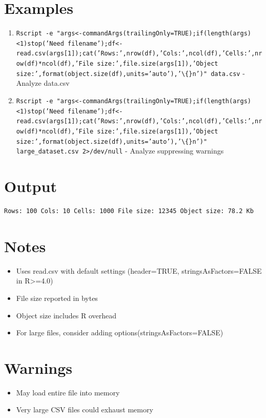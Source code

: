 \documentclass{article}
\begin{document}
\section*{Examples}
\begin{enumerate}
  \item \texttt{Rscript -e "args<-commandArgs(trailingOnly=TRUE);if(length(args)<1)stop('Need filename');df<-read.csv(args[1]);cat('Rows:',nrow(df),'Cols:',ncol(df),'Cells:',nrow(df)*ncol(df),'File size:',file.size(args[1]),'Object size:',format(object.size(df),units='auto'),'\textbackslash\{\}n')" data.csv} - Analyze data.csv
  \item \texttt{Rscript -e "args<-commandArgs(trailingOnly=TRUE);if(length(args)<1)stop('Need filename');df<-read.csv(args[1]);cat('Rows:',nrow(df),'Cols:',ncol(df),'Cells:',nrow(df)*ncol(df),'File size:',file.size(args[1]),'Object size:',format(object.size(df),units='auto'),'\textbackslash\{\}n')" large\_dataset.csv 2>/dev/null} - Analyze suppressing warnings
\end{enumerate}

\section*{Output}
\begin{lstlisting}
Rows: 100 Cols: 10 Cells: 1000 File size: 12345 Object size: 78.2 Kb

\end{lstlisting}

\section*{Notes}
\begin{itemize}
  \item Uses read.csv with default settings (header=TRUE, stringsAsFactors=FALSE in R>=4.0)
  \item File size reported in bytes
  \item Object size includes R overhead
  \item For large files, consider adding options(stringsAsFactors=FALSE)
\end{itemize}

\section*{Warnings}
\begin{itemize}
  \item May load entire file into memory
  \item Very large CSV files could exhaust memory
\end{itemize}
\end{document}
